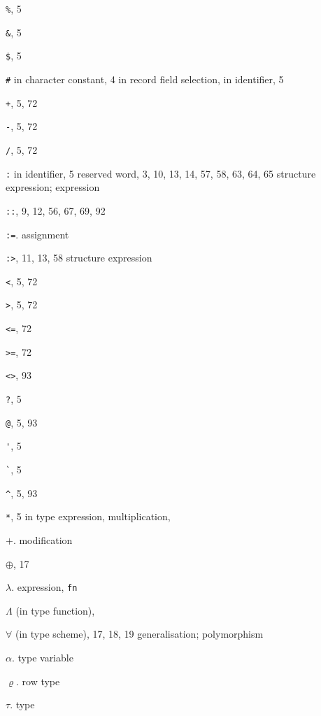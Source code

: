 \begin{theindex}
\item \verb+%+, 5
\item \verb+&+, 5
\item \verb+$+, 5
\item \verb+#+
\subitem in character constant, 4
\subitem in record field selection, \hashrefs
\subitem in identifier, 5
\item \verb(+(, 5, 72
\item \verb+-+, 5, 72
\item \verb+/+, 5, 72
\item \verb+:+ 
\subitem in identifier, 5
\subitem reserved word, 3, 10, 13, 14, 57, 58, 63, 64, 65
\subitem \seealso structure expression; expression
\item \verb+::+, 9, 12, 56, 67, 69, 92
\item \verb+:=+. \see assignment
\item \verb+:>+, 11, 13, 58 
\subitem \seealso structure expression
\item \verb+<+, 5, 72
\item \verb+>+, 5, 72
\item \verb+<=+, 72
\item \verb+>=+, 72
\item \verb+<>+, 93
\item \verb+?+, 5
\item \verb+@+, 5, 93
\item \verb+'+, 5
\item \verb+`+, 5
\item \verb+^+, 5, 93
\item \verb+*+, 5
\subitem in type expression, \startyperefs
\subitem multiplication, \mulrefs
\item $+$. \see modification
\item $\oplus$, 17
\item $\lambda$. \see expression, {\tt fn}
\item $\Lambda$ (in type function), \Lambdarefs
\item $\forall$ (in type scheme), 17, 18, 19
\subitem \seealso generalisation; polymorphism
\item $\alpha$. \see type variable 
\item $\varrho$. \see row type 

\item $\tau$. \see type 


\end{theindex}
